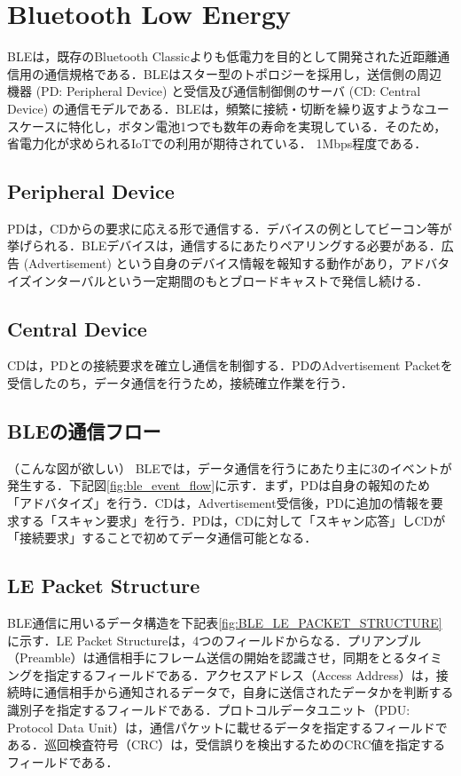 \section{Bluetooth Low Energy}
BLEは，既存のBluetooth Classicよりも低電力を目的として開発された近距離通信用の通信規格である．BLEはスター型のトポロジーを採用し，送信側の周辺機器 (PD: Peripheral Device) と受信及び通信制御側のサーバ (CD: Central Device) の通信モデルである．BLEは，頻繁に接続・切断を繰り返すようなユースケースに特化し，ボタン電池1つでも数年の寿命を実現している．そのため，省電力化が求められるIoTでの利用が期待されている．
1Mbps程度である．

\subsection{Peripheral Device}
PDは，CDからの要求に応える形で通信する．デバイスの例としてビーコン等が挙げられる．BLEデバイスは，通信するにあたりペアリングする必要がある．広告 (Advertisement) という自身のデバイス情報を報知する動作があり，アドバタイズインターバルという一定期間のもとブロードキャストで発信し続ける．

\subsection{Central Device}
CDは，PDとの接続要求を確立し通信を制御する．PDのAdvertisement Packetを受信したのち，データ通信を行うため，接続確立作業を行う．

\subsection{BLEの通信フロー}
（こんな図が欲しい）
BLEでは，データ通信を行うにあたり主に3のイベントが発生する．下記図\ref{fig:ble_event_flow}に示す．まず，PDは自身の報知のため「アドバタイズ」を行う．CDは，Advertisement受信後，PDに追加の情報を要求する「スキャン要求」を行う．PDは，CDに対して「スキャン応答」しCDが「接続要求」することで初めてデータ通信可能となる．

\subsection{LE Packet Structure}
BLE通信に用いるデータ構造を下記表\ref{fig:BLE_LE_PACKET_STRUCTURE}に示す．LE Packet Structureは，4つのフィールドからなる．プリアンブル（Preamble）は通信相手にフレーム送信の開始を認識させ，同期をとるタイミングを指定するフィールドである．アクセスアドレス（Access Address）は，接続時に通信相手から通知されるデータで，自身に送信されたデータかを判断する識別子を指定するフィールドである．プロトコルデータユニット（PDU: Protocol Data Unit）は，通信パケットに載せるデータを指定するフィールドである．巡回検査符号（CRC）は，受信誤りを検出するためのCRC値を指定するフィールドである．

